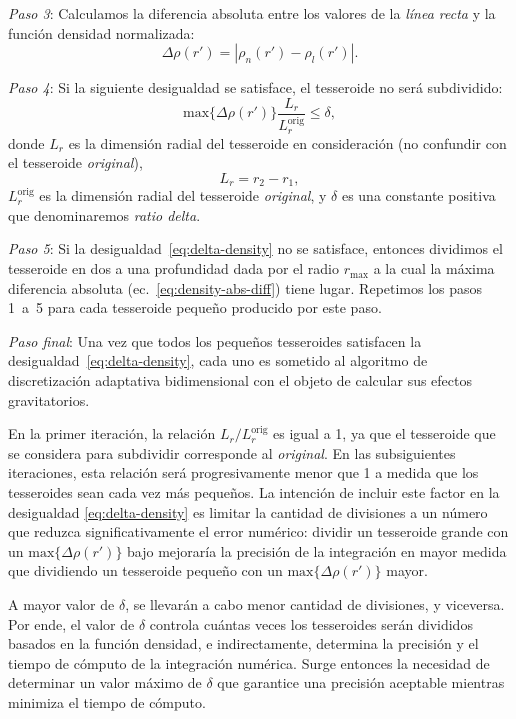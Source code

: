 \textit{Paso 3}:
Calculamos la diferencia absoluta entre los valores de la \emph{línea recta}
y la función densidad normalizada:
%
\begin{equation}
    \Delta \rho (r') = | \rho_n(r') - \rho_l(r') |.
    \label{eq:density-abs-diff}
\end{equation}

\textit{Paso 4}:
Si la siguiente desigualdad se satisface, el tesseroide no será subdividido:
%
\begin{equation}
    \text{max}\{ \Delta \rho(r') \} \frac{L_r}{L_r^\text{orig}} \le \delta,
    \label{eq:delta-density}
\end{equation}
%
donde $L_r$ es la dimensión radial del tesseroide en consideración
(no confundir con el tesseroide \emph{original}),
%
\begin{equation}
    L_r = r_2 - r_1,
\end{equation}
%
$L_r^\text{orig}$ es la dimensión radial del tesseroide
\emph{original}, y $\delta$ es una constante positiva que denominaremos
\emph{ratio delta}.

\textit{Paso 5}:
Si la desigualdad~\ref{eq:delta-density} no se satisface, entonces dividimos el
tesseroide en dos a una profundidad dada por el radio $r_\text{max}$ a la cual
la máxima diferencia absoluta (ec.~\ref{eq:density-abs-diff}) tiene lugar.
Repetimos los pasos 1~a~5 para cada tesseroide pequeño producido por este paso.

\textit{Paso final}:
Una vez que todos los pequeños tesseroides satisfacen la
desigualdad~\ref{eq:delta-density}, cada uno es sometido al algoritmo de
discretización adaptativa bidimensional con el objeto de calcular sus efectos
gravitatorios.

En la primer iteración, la relación $L_r/L_r^\text{orig}$ es igual a 1, ya que
el tesseroide que se considera para subdividir corresponde al \emph{original}.
En las subsiguientes iteraciones, esta relación será progresivamente menor que
1 a medida que los tesseroides sean cada vez más pequeños.
La intención de incluir este factor en la desigualdad \ref{eq:delta-density} es
limitar la cantidad de divisiones a un número que reduzca significativamente el
error numérico: dividir un tesseroide grande con un $\text{max}\{ \Delta
\rho(r') \}$ bajo mejoraría la precisión de la integración en mayor medida que
dividiendo un tesseroide pequeño con un $\text{max}\{ \Delta \rho(r') \}$
mayor.

A mayor valor de $\delta$, se llevarán a cabo menor cantidad de divisiones,
y viceversa.
Por ende, el valor de $\delta$ controla cuántas veces los tesseroides serán
divididos basados en la función densidad, e indirectamente, determina la
precisión y el tiempo de cómputo de la integración numérica.
Surge entonces la necesidad de determinar un valor máximo de $\delta$ que
garantice una precisión aceptable mientras minimiza el tiempo de cómputo.


